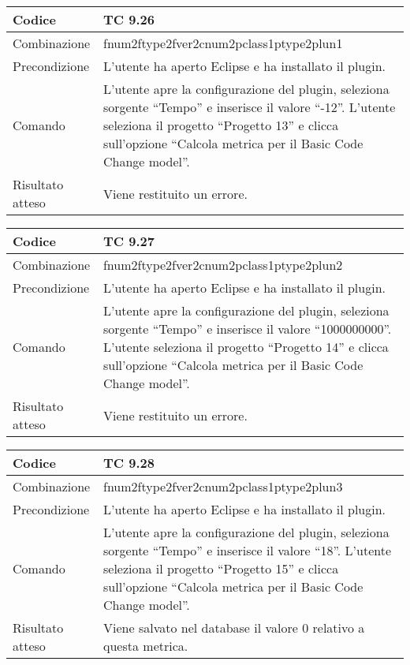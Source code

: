 \begin{table}[ht]
\begin{tabular}{|p{3cm}|p{9cm}|}
\hline
\cellcolor{lightgray}Codice				& TC 9.26								\\
\hline
\cellcolor{lightgray}Combinazione		& fnum2ftype2fver2cnum2pclass1ptype2plun1									\\
\hline
\cellcolor{lightgray}Precondizione		& L'utente ha aperto Eclipse e ha installato il plugin.		\\
\hline
\cellcolor{lightgray}Comando			& L'utente apre la configurazione del plugin, seleziona sorgente ``Tempo'' e inserisce il valore ``-12''. L'utente seleziona il progetto ``Progetto 13''  e clicca sull'opzione ``Calcola metrica per il Basic Code Change model''.	\\
\hline
\cellcolor{lightgray}Risultato atteso	& Viene restituito un errore.\\
\hline
\end{tabular}
\end{table}

\begin{table}[ht]
\begin{tabular}{|p{3cm}|p{9cm}|}
\hline
\cellcolor{lightgray}Codice				& TC 9.27								\\
\hline
\cellcolor{lightgray}Combinazione		& fnum2ftype2fver2cnum2pclass1ptype2plun2									\\
\hline
\cellcolor{lightgray}Precondizione		& L'utente ha aperto Eclipse e ha installato il plugin.		\\
\hline
\cellcolor{lightgray}Comando			& L'utente apre la configurazione del plugin, seleziona sorgente ``Tempo'' e inserisce il valore ``1000000000''. L'utente seleziona il progetto ``Progetto 14''  e clicca sull'opzione ``Calcola metrica per il Basic Code Change model''.	\\
\hline
\cellcolor{lightgray}Risultato atteso	& Viene restituito un errore.\\
\hline
\end{tabular}
\end{table}

\begin{table}[ht]
\begin{tabular}{|p{3cm}|p{9cm}|}
\hline
\cellcolor{lightgray}Codice				& TC 9.28								\\
\hline
\cellcolor{lightgray}Combinazione		& fnum2ftype2fver2cnum2pclass1ptype2plun3									\\
\hline
\cellcolor{lightgray}Precondizione		& L'utente ha aperto Eclipse e ha installato il plugin.		\\
\hline
\cellcolor{lightgray}Comando			& L'utente apre la configurazione del plugin, seleziona sorgente ``Tempo'' e inserisce il valore ``18''. L'utente seleziona il progetto ``Progetto 15''  e clicca sull'opzione ``Calcola metrica per il Basic Code Change model''.	\\
\hline
\cellcolor{lightgray}Risultato atteso	& Viene salvato nel database il valore 0 relativo a questa metrica.\\
\hline
\end{tabular}
\end{table}


